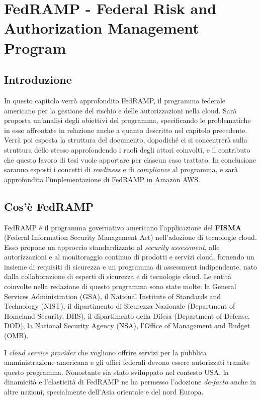 \documentclass[../main.tex]{subfiles}
\begin{document}
\chapter{FedRAMP - Federal Risk and Authorization Management Program}
\section{Introduzione}
In questo capitolo verrà approfondito FedRAMP, il programma federale americano per la gestione del rischio e delle autorizzazioni nella cloud.
Sarà proposta un'analisi degli obiettivi del programma, specificando le problematiche in esso affrontate in relazione anche a quanto descritto nel capitolo precedente.
Verrà poi esposta la struttura del documento, dopodiché ci si concentrerà sulla struttura dello stesso approfondendo i ruoli degli attori coinvolti, e il contributo che questo lavoro di tesi vuole apportare per ciascun caso trattato.
In conclusione saranno esposti i concetti di \textit{readiness} e di \textit{compliance} al programma, e sarà approfondita l'implementazione di FedRAMP in Amazon AWS.

\section{Cos'è FedRAMP}
FedRAMP è il programma governativo americano l'applicazione del \textbf{FISMA} (Federal Information Security Management Act) nell'adozione di tecnologie cloud.
Esso propone un approccio standardizzato al \textit{security assessment}, alle autorizzazioni e al monitoraggio continuo di prodotti e servizi cloud, fornendo un insieme di requisiti di sicurezza e un programma di assessment indipendente, nato dalla collaborazione di esperti di sicurezza e di tecnologie cloud.
Le entità coinvolte nella redazione di questo programma sono state molte: la General Services Administration (GSA), il National Institute of Standards and Technology (NIST), il dipartimento di Sicurezza Nazionale (Department of Homeland Security, DHS), il dipartimento della Difesa (Department of Defense, DOD), la National Security Agency (NSA), l'Office of Management and Budget (OMB).

I \textit{cloud service provider} che vogliono offrire servizi per la pubblica amministrazione americana e gli uffici federali devono essere autorizzati tramite questo programma.
Nonostante sia stato sviluppato nel contesto USA, la dinamicità e l'elasticità di FedRAMP ne ha permesso l'adozione \textit{de-facto} anche in altre nazioni, specialmente dell'Asia orientale e del nord Europa.
\end{document}
